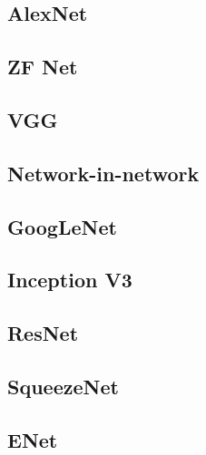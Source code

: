 \subsection{AlexNet} %
\label{alexnet}


\subsection{ZF Net}
\label{zfnet}

\subsection{VGG} %
\label{vgg}

\subsection{Network-in-network}
\label{nin}

\subsection{GoogLeNet}
\label{googlenet}

\subsection{Inception V3}
\label{inception}

\subsection{ResNet} %
\label{resnet}

\subsection{SqueezeNet}
\label{squeezenet}

\subsection{ENet}
\label{enet}
